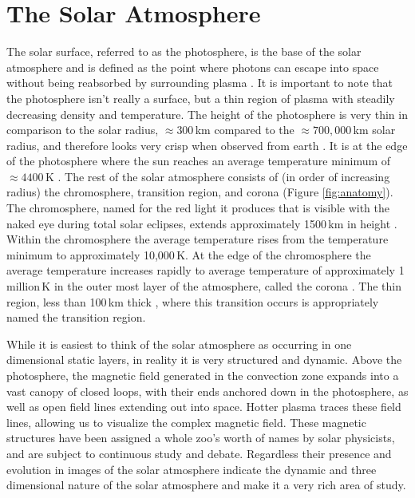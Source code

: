 \section{The Solar Atmosphere}
The solar surface, referred to as the photosphere, is the base of the solar atmosphere and is defined as the point where photons can escape into space without being reabsorbed by surrounding plasma \citep{Priest2014}.
It is important to note that the photosphere isn't really a surface, but a thin region of plasma with steadily decreasing density and temperature.
The height of the photosphere is very thin in comparison to the solar radius, $\approx300$\,km compared to the $\approx700,000$\,km solar radius, and therefore looks very crisp when observed from earth \citep{JudgeBook}.
It is at the edge of the photosphere where the sun reaches an average temperature minimum of $\approx4400$\,K \citep{SolarPhysicsOverview}.
The rest of the solar atmosphere consists of (in order of increasing radius) the chromosphere, transition region, and corona (Figure \ref{fig:anatomy}).
The chromosphere, named for the red light it produces that is visible with the naked eye during total solar eclipses, extends approximately 1500\,km in height \citep{SolarPhysicsOverview}.
Within the chromosphere the average temperature rises from the temperature minimum to approximately 10,000\,K.
At the edge of the chromosphere the average temperature increases rapidly to average temperature of approximately 1 million\,K in the outer most layer of the atmosphere, called the corona \citep{SolarPhysicsOverview}.
The thin region, less than 100\,km thick \citep{Priest2014}, where this transition occurs is appropriately named the transition region.


While it is easiest to think of the solar atmosphere as occurring in one dimensional static layers, in reality it is very structured and dynamic.
Above the photosphere, the magnetic field generated in the convection zone expands into a vast canopy of closed loops, with their ends anchored down in the photosphere, as well as open field lines extending out into space.
Hotter plasma traces these field lines, allowing us to visualize the complex magnetic field.
These magnetic structures have been assigned a whole zoo's worth of names by solar physicists, and are subject to continuous study and debate.
Regardless their presence and evolution in images of the solar atmosphere indicate the dynamic and three dimensional nature of the solar atmosphere and make it a very rich area of study.


